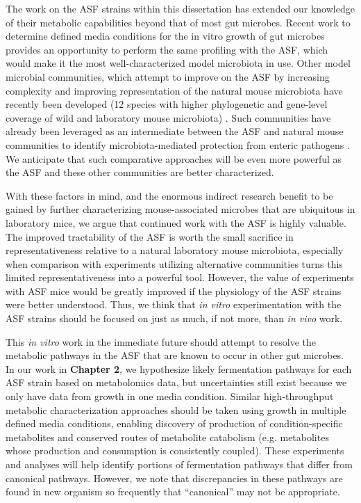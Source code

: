 \documentclass[11pt,twocolumn,notitlepage,openany,twoside]{book}
\begin{document}
\begin{refsection}
The work on the ASF strains within this dissertation has extended our knowledge of their metabolic capabilities beyond that of most gut microbes. Recent work to determine defined media conditions for the in vitro growth of gut microbes provides an opportunity to perform the same profiling with the ASF, which would make it the most well-characterized model microbiota in use. Other model microbial communities, which attempt to improve on the ASF by increasing complexity and improving representation of the natural mouse microbiota have recently been developed (12 species with higher phylogenetic and gene-level coverage of wild and laboratory mouse microbiota) \cite{Garzetti2017-os}. Such communities have already been leveraged as an intermediate between the ASF and natural mouse communities to identify microbiota-mediated protection from enteric pathogens \cite{Brugiroux2016-vi}. We anticipate that such comparative approaches will be even more powerful as the ASF and these other communities are better characterized.

With these factors in mind, and the enormous indirect research benefit to be gained by further characterizing mouse-associated microbes that are ubiquitous in laboratory mice, we argue that continued work with the ASF is highly valuable. The improved tractability of the ASF is worth the small sacrifice in representativeness relative to a natural laboratory mouse microbiota, especially when comparison with experiments utilizing alternative communities turns this limited representativeness into a powerful tool. However, the value of experiments with ASF mice would be greatly improved if the physiology of the ASF strains were better understood. Thus, we think that \textit{in vitro} experimentation with the ASF strains should be focused on just as much, if not more, than \textit{in vivo} work.

This \textit{in vitro} work in the immediate future should attempt to resolve the metabolic pathways in the ASF that are known to occur in other gut microbes. In our work in \textbf{Chapter 2}, we hypothesize likely fermentation pathways for each ASF strain based on metabolomics data, but uncertainties still exist because we only have data from growth in one media condition. Similar high-throughput metabolic characterization approaches should be taken using growth in multiple defined media conditions, enabling discovery of production of condition-specific metabolites and conserved routes of metabolite catabolism (e.g. metabolites whose production and consumption is consistently coupled). These experiments and analyses will help identify portions of fermentation pathways that differ from canonical pathways. However, we note that discrepancies in these pathways are found in new organism so frequently that “canonical” may not be appropriate.


\end{refsection}
\end{document}

